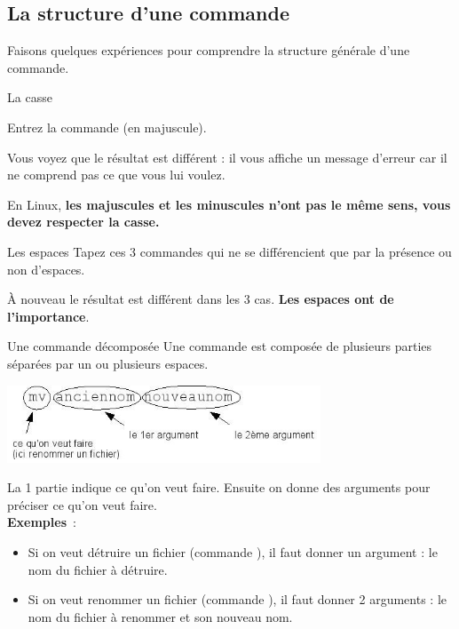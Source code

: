 \documentclass[a4paper,11pt]{style-esi/td}
\begin{document}
\subsection{La structure d'une commande}

	Faisons quelques expériences pour comprendre
	la structure générale d'une commande.

	\begin{Experience}{La casse} 
		\vspace{-1em}
		\begin{steps}
			\item Entrez la commande  (en majuscule).
		\end{steps}
		Vous voyez que le résultat est différent :
		il vous affiche un message d'erreur 
		car il ne comprend pas ce que vous lui voulez.
		\begin{infobox}
			En Linux, 
			\textbf{les majuscules et les minuscules n'ont pas le même sens, 
			vous devez respecter la casse.}
		\end{infobox}
	\end{Experience}	
        
	\begin{Experience}{Les espaces} 
		Tapez ces 3 commandes qui ne se différencient 
		que par la présence ou non d'espaces.
		\begin{steps}
		\item \kbd{ls dev1}
		\item \kbd{lsdev1}
		\item \kbd{ls dev 1}
		\end{steps}
		À nouveau le résultat est différent dans les 3 cas. 
		\textbf{Les espaces ont de l'importance}.
	\end{Experience}				

	\begin{theorie}{Une commande décomposée}
		Une commande est composée de plusieurs parties 
		séparées par un ou plusieurs espaces. 
		\begin{center}
			\includegraphics[width=0.7\textwidth]{images/commande.jpg}
		\end{center}
		La 1\iere{} partie indique ce qu'on veut faire. 
		Ensuite on donne des arguments pour préciser ce qu'on veut faire.
		\\
		\textbf{Exemples} :
		\begin{itemize}
		\item 
			Si on veut détruire un fichier (commande ), 
			il faut donner un argument : le nom du fichier à détruire.
		\item 
			Si on veut renommer un fichier (commande ), 
			il faut donner 2 arguments : 
			le nom du fichier à renommer et son nouveau nom.
		\end{itemize}
	\end{theorie}
\end{document}
